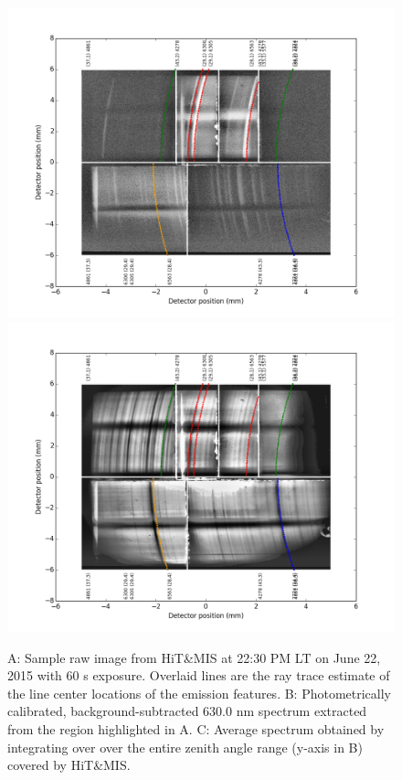 \begin{figure}[hp]
	\centering\includegraphics[width=30pc]{hitmis_nighttime.png}
    \centering\includegraphics[width=30pc]{hitmis_daytime.png}
	\caption{A: Sample raw image from HiT\&MIS at 22:30 PM LT on June 22, 2015 with 60 s exposure. Overlaid lines are the ray trace estimate of the line center locations of the emission features. B: Photometrically calibrated, background-subtracted 630.0 nm spectrum extracted from the region highlighted in A. C: Average spectrum obtained by integrating over 
		over the entire zenith angle range (y-axis in B) covered by HiT\&MIS.}
	\label{fig:raw}
\end{figure}
